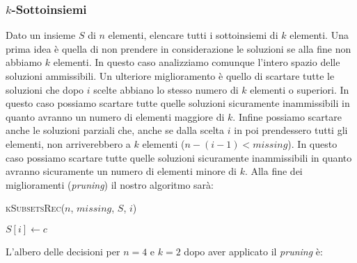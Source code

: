         \subsubsection{$k$-Sottoinsiemi}
            Dato un insieme $S$ di $n$ elementi, elencare tutti i sottoinsiemi di $k$ elementi.\newline
            Una prima idea è quella di non prendere in considerazione le soluzioni se alla fine non abbiamo $k$ elementi. In questo caso analizziamo comunque l'intero spazio delle soluzioni ammissibili.\newline
            Un ulteriore miglioramento è quello di scartare tutte le soluzioni che dopo $i$ scelte abbiano lo stesso numero di $k$ elementi o superiori. In questo caso possiamo scartare tutte quelle soluzioni sicuramente inammissibili in quanto avranno un numero di elementi maggiore di $k$.\newline
            Infine possiamo scartare anche le soluzioni parziali che, anche se dalla scelta $i$ in poi prendessero tutti gli elementi, non arriverebbero a $k$ elementi ($n-(i-1)<missing$). In questo caso possiamo scartare tutte quelle soluzioni sicuramente inammissibili in quanto avranno sicuramente un numero di elementi minore di $k$.\newline
            Alla fine dei miglioramenti (\textit{pruning}) il nostro algoritmo sarà:
            \begin{algorithm}[H]
                \caption{\textsc{kSubsetsRec}(\Int $n$, \Int $missing$, \Int[] $S$, \Int $i$)}
                \begin{algorithmic}
                     
                        \State {}
                     
                            \State $S[i] \gets c$ 
                            \State {} 
                        \EndFor
                    \EndIf
                \end{algorithmic}
            \end{algorithm}
            L'albero delle decisioni per $n = 4$ e $k = 2$ dopo aver applicato il \textit{pruning} è:
